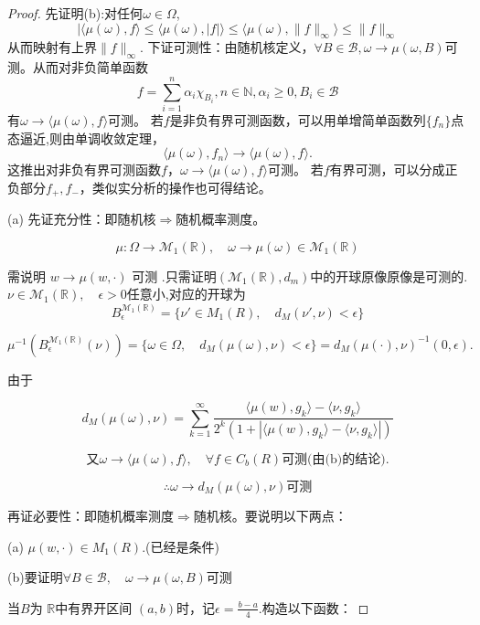 \begin{proof}
    先证明(b):对任何$\omega\in\Omega$,
    \[|\langle\mu(\omega),f\rangle\le\langle\mu(\omega),|f|\rangle\le\langle\mu(\omega),\|f\|_\infty\rangle\le\|f\|_\infty \]
    从而映射有上界$\|f\|_\infty$.
    下证可测性：由随机核定义，$\forall B\in\mathcal{B},\omega\rightarrow\mu(\omega,B)$可测。从而对非负简单函数
    \[f=\sum_{i=1}^n\alpha_i\chi_{B_i},n\in\mathbb{N},\alpha_i\ge 0,B_i\in \mathcal{B}\]
    有$\omega\rightarrow\langle\mu(\omega),f\rangle$可测。
    若$f$是非负有界可测函数，可以用单增简单函数列$\{f_n\}$点态逼近,则由单调收敛定理，
    \[\langle\mu(\omega),f_n\rangle\to\langle\mu(\omega),f\rangle.\]
    这推出对非负有界可测函数$f$，$\omega\rightarrow\langle\mu(\omega),f\rangle$可测。
    若$f$有界可测，可以分成正负部分$f_+,f_-$，类似实分析的操作也可得结论。

    (a)
    先证充分性：即随机核$\Rightarrow$随机概率测度。

    \[\mu : \Omega \to \mathcal{M}_1 (\mathbb{R}), \quad \omega\to \mu(\omega) \in \mathcal{M}_1 (\mathbb{R})\]

需说明 $ w \to \mu(w, \cdot) $ 可测 .只需证明$(\mathcal{M}_1 (\mathbb{R}), d_{m})$中的开球原像原像是可测的.
$\nu \in \mathcal{M}_1 (\mathbb{R}), \quad \epsilon > 0 $任意小,对应的开球为
\[B_{\epsilon}^{\mathcal{M}_1 (\mathbb{R})} = \{ \nu' \in M_{1}(R), \quad d_{M}(\nu', \nu) < \epsilon \}\]

\[\mu^{-1} (B_{\epsilon}^{\mathcal{M}_1 (\mathbb{R})}(\nu)) = \{ \omega\in \Omega, \quad d_{M}(\mu(\omega), \nu) < \epsilon \}= d_{M}(\mu(\cdot), \nu)^{-1}(0, \epsilon).\]


由于

\[d_M(\mu(\omega), \nu) = \sum_{k=1}^{\infty} \frac{\langle \mu(w), g_{k} \rangle - \langle \nu, g_{k} \rangle}{2^{k}(1+|\langle \mu(w), g_{k} \rangle - \langle \nu, g_{k} \rangle|)}\]

\[ \text{又}\omega \to \langle \mu(\omega), f \rangle, \quad \forall f \in C_{b}(R) \text{可测(由(b)的结论)}.\]

\[\therefore \omega \to d_M(\mu(\omega), \nu) \text{可测}\]


再证必要性：即随机概率测度$\Rightarrow$随机核。要说明以下两点：

(a) $ \mu(w, \cdot) \in M_{1}(R).$(已经是条件)

(b)要证明$\forall B \in \mathcal{B}, \quad \omega \to \mu(\omega, B)$可测

当$ B $为 $\mathbb{R}$中有界开区间  $(a, b)$时，记$ \epsilon = \frac{b-a}{4}.$构造以下函数：



\end{proof}
